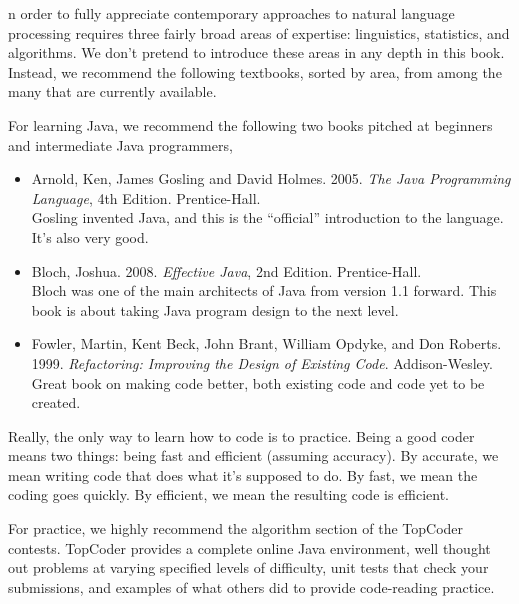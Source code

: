 \label{appendix:reading}

\noindent
{}n order to fully appreciate contemporary approaches to natural language
processing requires three fairly broad areas of expertise:
linguistics, statistics, and algorithms.  We don't pretend to
introduce these areas in any depth in this book.  Instead, we
recommend the following textbooks, sorted by area, from among the many
that are currently available.


\noindent
For learning Java, we recommend the following two books pitched at
beginners and intermediate Java programmers,
%
\begin{itemize}
\item Arnold, Ken, James Gosling and David Holmes.  2005.
{\it The Java Programming Language}, 4th Edition.  Prentice-Hall.
\\
{\footnotesize Gosling invented Java, and this is the ``official'' introduction to the
language.  It's also very good.}
%
\item Bloch, Joshua. 2008. {\it Effective Java}, 2nd Edition.  Prentice-Hall.
\\
{\footnotesize Bloch was one of the main architects of Java from
version 1.1 forward.  This book is about taking Java program design
to the next level.}
%
\item
Fowler, Martin, Kent Beck, John Brant, William Opdyke, and Don Roberts.
1999.
{\it Refactoring: Improving the Design of Existing Code}.
Addison-Wesley.
\\
{\footnotesize Great book on making code better, both existing
code and code yet to be created.}
\end{itemize}
%



\noindent
Really, the only way to learn how to code is to practice.  Being a
good coder means two things: being fast and efficient (assuming
accuracy).  By accurate, we mean writing code that does what it's
supposed to do.  By fast, we mean the coding goes quickly.  By efficient,
we mean the resulting code is efficient.

For practice, we highly recommend the algorithm section of the
TopCoder contests.  TopCoder provides a complete online Java
environment, well thought out problems at varying specified levels of
difficulty, unit tests that check your submissions, and examples of
what others did to provide code-reading practice.
%
\begin{quote}
\end{quote}
%



